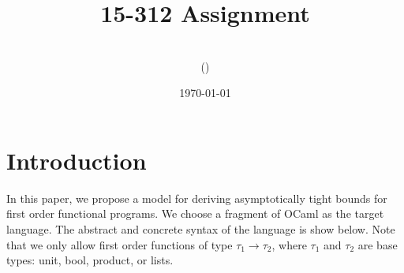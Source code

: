 \documentclass[11pt]{article}
\title{15-312 Assignment \hwnumber}
\author{\myname\\(\myandrewid)}
\date{\today}
\theoremstyle{definition}
\begin{document}
\maketitle
{}

\section{Introduction}

\noindent
In this paper, we propose a model for deriving asymptotically tight bounds for first order functional programs. We choose a fragment of OCaml as the target language. The abstract and concrete syntax of the language is show below. Note that we only allow first order functions of type $\tau_1 \to \tau_2$, where $\tau_1$ and $\tau_2$ are base types: unit, bool, product, or lists. 
\end{document}
